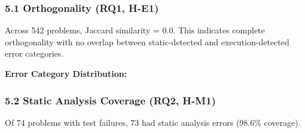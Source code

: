 
\subsubsection{5.1 Orthogonality (RQ1, H-E1)}

\begin{table}[htbp]
\centering
{}
\end{table}

Across 542 problems, Jaccard similarity = 0.0. This indicates complete orthogonality with no overlap between static-detected and execution-detected error categories.

\textbf{Error Category Distribution:}

\begin{table}[htbp]
\centering
{}
\end{table}

\subsubsection{5.2 Static Analysis Coverage (RQ2, H-M1)}

\begin{table}[htbp]
\centering
{}
\end{table}

Of 74 problems with test failures, 73 had static analysis errors (98.6\% coverage).

